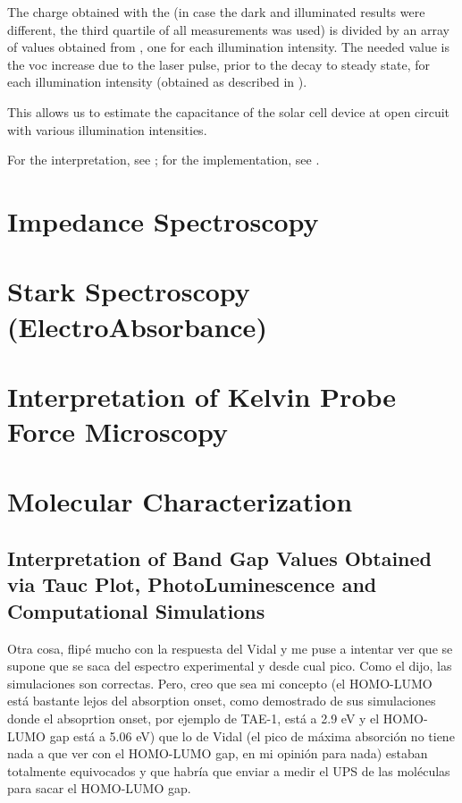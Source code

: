 	The charge obtained with the  (in case the dark and illuminated results were different, the third quartile of all  measurements was used) is divided by an array of values obtained from , one for each illumination intensity. The needed value is the \gls{voc} increase due to the laser pulse, prior to the decay to steady state, for each illumination intensity (obtained as described in ).

	This allows us to estimate the capacitance of the solar cell device at open circuit with various illumination intensities.

	For the interpretation, see ; for the implementation, see .

\section{Impedance Spectroscopy}

\section{Stark Spectroscopy (ElectroAbsorbance)}

\section{Interpretation of Kelvin Probe Force Microscopy}\label{interpretation_kpfm}

\section{Molecular Characterization}
\subsection{Interpretation of Band Gap Values Obtained via Tauc Plot, PhotoLuminescence and Computational Simulations}\label{interpretation_bg}

	Otra cosa, flipé mucho con la respuesta del Vidal y me puse a intentar
	ver que se supone que se saca del espectro experimental y desde cual
	pico. Como el dijo, las simulaciones son correctas.
	Pero, creo que sea mi concepto (el HOMO-LUMO está bastante lejos del
	absorption onset, como demostrado de sus simulaciones donde el
	absoprtion onset, por ejemplo de TAE-1, está a 2.9 eV y el HOMO-LUMO gap
	está a 5.06 eV) que lo de Vidal (el pico de máxima absorción no tiene
	nada a que ver con el HOMO-LUMO gap, en mi opinión para nada) estaban
	totalmente equivocados y que habría que enviar a medir el UPS de las
	moléculas para sacar el HOMO-LUMO gap.

